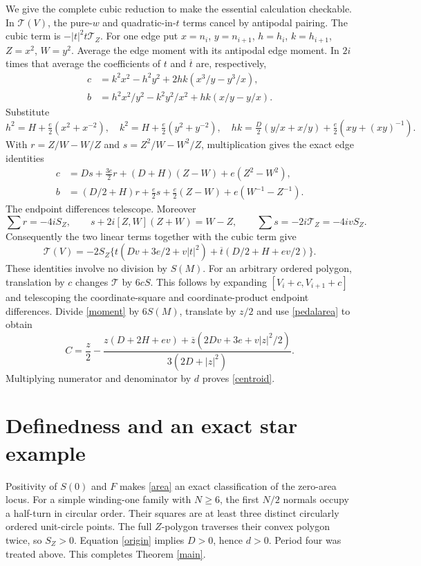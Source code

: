 \documentclass[11pt]{article}
\newcommand{\cross}[2]{[#1,#2]}
\begin{document}
We give the complete cubic reduction to make the essential calculation
checkable. In $\mathcal T(V)$, the pure-$w$ and quadratic-in-$t$ terms
cancel by antipodal pairing. The cubic term is $-|t|^2t\mathcal T_Z$.
For one edge put $x=n_i$, $y=n_{i+1}$, $h=h_i$, $k=h_{i+1}$, $Z=x^2$,
$W=y^2$. Average the edge moment with its antipodal edge moment.
In $2i$ times that average the coefficients of
$t$ and $\overline t$ are, respectively,
\begin{align*}
 c&=k^2x^2-h^2y^2+2hk(x^3/y-y^3/x),\\
 b&=h^2x^2/y^2-k^2y^2/x^2+hk(x/y-y/x).
\end{align*}
Substitute
\[
 h^2=H+\tfrac e2(x^2+x^{-2}),\quad
 k^2=H+\tfrac e2(y^2+y^{-2}),\quad
 hk=\tfrac D2(y/x+x/y)+\tfrac e2(xy+(xy)^{-1}).
\]
With $r=Z/W-W/Z$ and $s=Z^2/W-W^2/Z$, multiplication gives the exact
edge identities
\begin{align*}
 c&=Ds+\tfrac{3e}{2}r+(D+H)(Z-W)+e(Z^2-W^2),\\
 b&=(D/2+H)r+\tfrac e2s+\tfrac e2(Z-W)+e(W^{-1}-Z^{-1}).
\end{align*}
The endpoint differences telescope. Moreover
\[
 \sum r=-4iS_Z,\qquad
 s+2i\cross{Z}{W}(Z+W)=W-Z,
 \qquad\sum s=-2i\mathcal T_Z=-4ivS_Z.
\]
Consequently the two linear terms together with the cubic term give
\begin{equation}\label{moment}
 \mathcal T(V)=-2S_Z\{t(Dv+3e/2+v|t|^2)
                +\overline t(D/2+H+ev/2)\}.
\end{equation}
These identities involve no division by $S(M)$.
For an arbitrary ordered polygon, translation by $c$ changes
$\mathcal T$ by $6cS$. This follows by expanding
$\cross{V_i+c}{V_{i+1}+c}$ and telescoping the coordinate-square and
coordinate-product endpoint differences.
Divide \eqref{moment} by $6S(M)$, translate by $z/2$ and use
\eqref{pedalarea} to obtain
\[
 C=\frac z2-
 \frac{z(D+2H+ev)+\overline z(2Dv+3e+v|z|^2/2)}
 {3(2D+|z|^2)}.
\]
Multiplying numerator and denominator by $d$ proves \eqref{centroid}.

\section{Definedness and an exact star example}
Positivity of $S(0)$ and $F$ makes \eqref{area} an exact classification of
the zero-area locus. For a simple winding-one family with $N\geq6$, the
first $N/2$ normals occupy a half-turn in circular order. Their squares are
at least three distinct circularly ordered unit-circle points. The full
$Z$-polygon traverses their convex polygon twice, so $S_Z>0$.
Equation \eqref{origin} implies $D>0$, hence $d>0$. Period four was
treated above. This completes Theorem \ref{main}.
\end{document}
